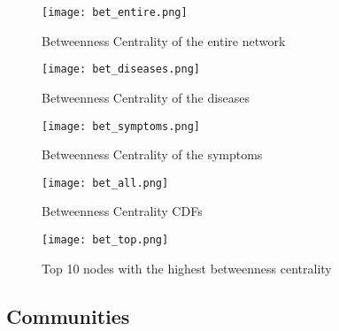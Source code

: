 \begin{figure}[H]
    \centering
    \texttt{[image: bet\_entire.png]}
    \caption{Betweenness Centrality of the entire network}
    \label{fig:bet_entire}
\end{figure}

\begin{figure}[H]
    \centering
    \texttt{[image: bet\_diseases.png]}
    \caption{Betweenness Centrality of the diseases}
    \label{fig:bet_diseases}
\end{figure}

\begin{figure}[H]
    \centering
    \texttt{[image: bet\_symptoms.png]}
    \caption{Betweenness Centrality of the symptoms}
    \label{fig:bet_symptoms}
\end{figure}

\begin{figure}[H]
   \centering
   \texttt{[image: bet\_all.png]}
   \caption{Betweenness Centrality CDFs}
   \label{fig:bet_all}
\end{figure}

\begin{figure}[H]
    \centering
    \texttt{[image: bet\_top.png]}
    \caption{Top 10 nodes with the highest betweenness centrality}
    \label{fig:bet_top}
\end{figure}


\subsection{Communities}



